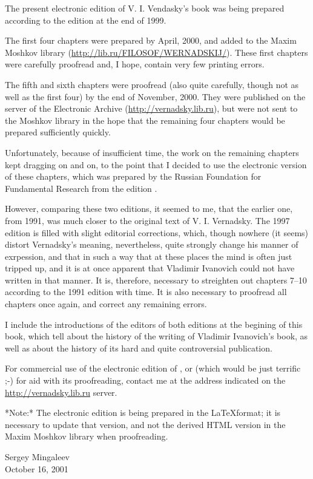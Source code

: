 
The present electronic edition of V. I. Vendasky's book  was being prepared according to the
edition at the end of 1999.

The first four chapters were prepared by April, 2000, and added to the Maxim
Moshkov library (\url{http://lib.ru/FILOSOF/WERNADSKIJ/}).  These first
chapters were carefully proofread and, I hope, contain very few printing
errors.

The fifth and sixth chapters were proofread (also quite carefully, though not
as well as the first four) by the end of November, 2000.  They were published
on the server of the Electronic Archive (\url{http://vernadsky.lib.ru}), but
were not sent to the Moshkov library in the hope that the remaining four
chapters would be prepared sufficiently quickly.

Unfortunately, because of insufficient time, the work on the remaining chapters
kept dragging on and on, to the point that I decided to use the electronic
version of these chapters, which was prepared by the Russian Foundation for
Fundamental Research
from the edition .

However, comparing these two editions, it seemed to me, that the earlier one,
from 1991, was much closer to the original text of V. I. Vernadsky.  The 1997
edition is filled with slight editorial corrections, which, though nowhere (it
seems) distort Vernadsky's meaning, nevertheless, quite strongly change his
manner of exrpession, and that in such a way that at these places the mind is
often just tripped up, and it is at once apparent that Vladimir Ivanovich could
not have written in that manner.  It is, therefore, necessary to streighten out
chapters 7--10 according to the 1991 edition with time.  It is also necessary
to proofread all chapters once again, and correct any remaining errors.

I include the introductions of the editors of both editions at the begining of
this book, which tell about the history of the writing of Vladimir Ivanovich's
book, as well as about the history of its hard and quite controversial
publication.

For commercial use of the electronic edition of , or (which would be just terrific ;-) for aid with its
proofreading, contact me at the address indicated on the
\url{http://vernadsky.lib.ru} server.

*Note:* The electronic edition is being prepared in the \LaTeX format; it is
necessary to update that version, and not the derived HTML version in the Maxim
Moshkov library when proofreading.

\begin{flushright}
Sergey Mingaleev\\
October 16, 2001
\end{flushright}
